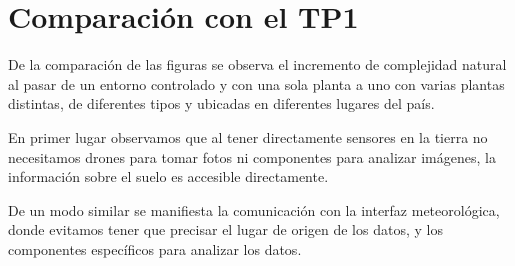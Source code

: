 \section{Comparación con el TP1}

De la comparación de las figuras se observa el incremento de complejidad natural al pasar de un entorno controlado y con una sola planta 
a uno con varias plantas distintas, de diferentes tipos y ubicadas en diferentes lugares del país.

En primer lugar observamos que al tener directamente sensores en la tierra no necesitamos drones para tomar fotos ni componentes para analizar imágenes,
la información sobre el suelo es accesible directamente. 

De un modo similar se manifiesta la comunicación con la interfaz meteorológica, donde evitamos tener que precisar el lugar de origen de los datos, y los
componentes específicos para analizar los datos. 